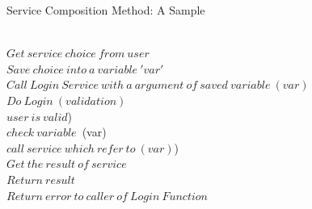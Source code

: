 \begin{algorithm*}[!htb]
\caption{Service Composition Method: A Sample}
\begin{code}
\uln \>\ubegin\\
\uln \>\>  $Get\ service\ choice\ from\ user$\\
\uln \>\>\> $Save\ choice\ into\ a\ variable\ 'var'$ \\
\uln \>\> $Call \ Login \ Service \ with\ a \ argument\ of \ saved \ variable\ (var)$\\
\uln \>\>\> $Do\ Login\ (validation)$\\
\uln \>\>\>\uif $user\ is\ valid$) \uthen\\
\uln \>\>\>\> $check\ variable$\ (var)\\
\uln \>\>\>\> $call\ service\ which\ refer\ to\ (var) $)\\
\uln \>\>\>\> $Get\ the\ result\ of\ service  $\\
\uln \>\>\>\> $Return\ result$\\
\uln \>\>\>\uelse  $Return\ error\ to\ caller\ of\ Login\ Function$  \\
\uln \>\uend\\ 
\end{code}
\label{alg:dfs}
\end{algorithm*}


